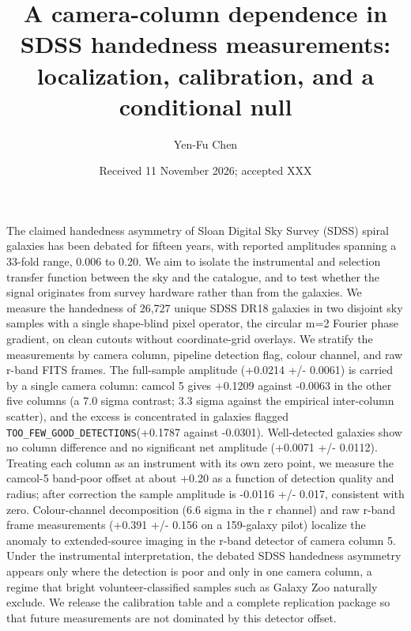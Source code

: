 \documentclass[linenumbers]{aa}
\newcommand{\toofew}{\texttt{TOO\_\allowbreak FEW\_\allowbreak GOOD\_\allowbreak DETECTIONS}}
\begin{document}
\title{A camera-column dependence in SDSS handedness measurements: localization, calibration, and a conditional null}

\author{Yen-Fu Chen}


\date{Received 11 November 2026; accepted XXX}

\abstract
  {The claimed handedness asymmetry of Sloan Digital Sky Survey (SDSS) spiral galaxies has been debated for fifteen years, with reported amplitudes spanning a 33-fold range, 0.006 to 0.20.}
  {We aim to isolate the instrumental and selection transfer function between the sky and the catalogue, and to test whether the signal originates from survey hardware rather than from the galaxies.}
  {We measure the handedness of 26,727 unique SDSS DR18 galaxies in two disjoint sky samples with a single shape-blind pixel operator, the circular m=2 Fourier phase gradient, on clean cutouts without coordinate-grid overlays. We stratify the measurements by camera column, pipeline detection flag, colour channel, and raw r-band FITS frames.}
  {The full-sample amplitude (+0.0214 +/- 0.0061) is carried by a single camera column: camcol 5 gives +0.1209 against -0.0063 in the other five columns (a 7.0 sigma contrast; 3.3 sigma against the empirical inter-column scatter), and the excess is concentrated in galaxies flagged \toofew (+0.1787 against -0.0301). Well-detected galaxies show no column difference and no significant net amplitude (+0.0071 +/- 0.0112). Treating each column as an instrument with its own zero point, we measure the camcol-5 band-poor offset at about +0.20 as a function of detection quality and radius; after correction the sample amplitude is -0.0116 +/- 0.017, consistent with zero. Colour-channel decomposition (6.6 sigma in the r channel) and raw r-band frame measurements (+0.391 +/- 0.156 on a 159-galaxy pilot) localize the anomaly to extended-source imaging in the r-band detector of camera column 5.}
  {Under the instrumental interpretation, the debated SDSS handedness asymmetry appears only where the detection is poor and only in one camera column, a regime that bright volunteer-classified samples such as Galaxy Zoo naturally exclude. We release the calibration table and a complete replication package so that future measurements are not dominated by this detector offset.}
\end{document}
